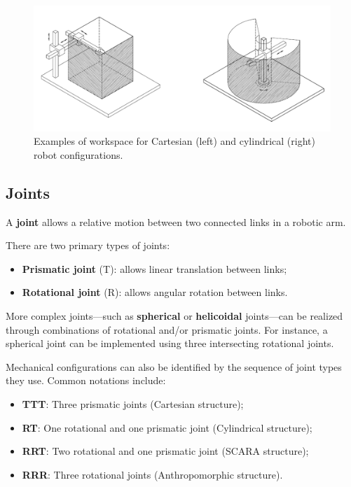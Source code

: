 \begin{figure}[H]
  \centering
  \includegraphics[width=0.85\linewidth]{imgs/workspace.png}
  \caption{Examples of workspace for Cartesian (left) and cylindrical (right) robot configurations.}
\end{figure}

\hfill

\subsection{Joints}

A \textbf{joint} allows a relative motion between two connected links in a robotic arm.

There are two primary types of joints:
\begin{itemize}
  \item \textbf{Prismatic joint} (T): allows linear translation between links;
  \item \textbf{Rotational joint} (R): allows angular rotation between links.
\end{itemize}

More complex joints—such as \textbf{spherical} or \textbf{helicoidal} joints—can be realized through combinations of rotational and/or prismatic joints.  
For instance, a spherical joint can be implemented using three intersecting rotational joints.

Mechanical configurations can also be identified by the sequence of joint types they use. Common notations include:

\begin{itemize}
  \item \textbf{TTT}: Three prismatic joints (Cartesian structure);
  \item \textbf{RT}: One rotational and one prismatic joint (Cylindrical structure);
  \item \textbf{RRT}: Two rotational and one prismatic joint (SCARA structure);
  \item \textbf{RRR}: Three rotational joints (Anthropomorphic structure).
\end{itemize}

